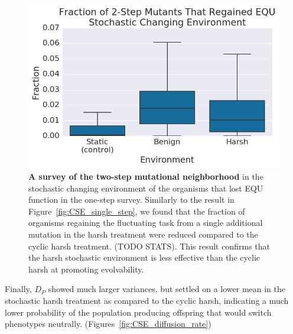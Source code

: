 \documentclass[letterpaper]{article}
\begin{document}
\begin{figure}[h!] %
\begin{center}
\includegraphics[trim={0.2cm 0 0.4cm 0.25cm},clip,width=1\columnwidth]{figures/CSE_frac_2step__box.png}
\caption{\textbf{A survey of the two-step mutational neighborhood} in the stochastic changing environment of the organisms that lost EQU function in the one-step survey. Similarly to the result in Figure~\ref{fig:CSE_single_step}, we found that the fraction of organisms regaining the fluctuating task from a single additional mutation in the harsh treatment were reduced compared to the cyclic harsh treatment. (TODO STATS). This result confirms that the harsh stochastic environment is less effective than the cyclic harsh at promoting evolvability.
}\label{fig:CSE_two_step}
\end{center}
\end{figure}

Finally, $D_P$ showed much larger variances, but settled on a lower mean in the stochastic harsh treatment as compared to the cyclic harsh, indicating a much lower probability of the population producing offspring that would switch phenotypes neutrally. (Figures~\ref{fig:CSE_diffusion_rate}) 
\end{document}
